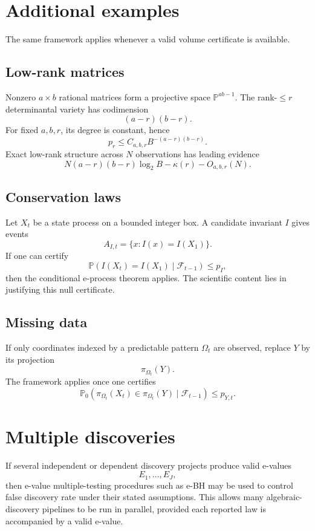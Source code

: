 \documentclass[11pt]{article}
\begin{document}
\section{Additional examples}

The same framework applies whenever a valid volume certificate is available.

\subsection{Low-rank matrices}

Nonzero $a\times b$ rational matrices form a projective space $\mathbb P^{ab-1}$. The rank-$\le r$ determinantal variety has codimension
\[
(a-r)(b-r).
\]
For fixed $a,b,r$, its degree is constant, hence
\[
p_r\le C_{a,b,r}B^{-(a-r)(b-r)}.
\]
Exact low-rank structure across $N$ observations has leading evidence
\[
N(a-r)(b-r)\log_2B-\kappa(r)-O_{a,b,r}(N).
\]

\subsection{Conservation laws}

Let $X_t$ be a state process on a bounded integer box. A candidate invariant $I$ gives events
\[
A_{I,t}=\{x:I(x)=I(X_1)\}.
\]
If one can certify
\[
\mathbb P(I(X_t)=I(X_1)\mid\mathcal F_{t-1})\le p_I,
\]
then the conditional e-process theorem applies. The scientific content lies in justifying this null certificate.

\subsection{Missing data}

If only coordinates indexed by a predictable pattern $\Omega_t$ are observed, replace $Y$ by its projection
\[
\pi_{\Omega_t}(Y).
\]
The framework applies once one certifies
\[
\mathbb P_0(\pi_{\Omega_t}(X_t)\in \pi_{\Omega_t}(Y)\mid\mathcal F_{t-1})\le p_{Y,t}.
\]

\section{Multiple discoveries}

If several independent or dependent discovery projects produce valid e-values
\[
E_1,\dots,E_J,
\]
then e-value multiple-testing procedures such as e-BH may be used to control false discovery rate under their stated assumptions. This allows many algebraic-discovery pipelines to be run in parallel, provided each reported law is accompanied by a valid e-value.
\end{document}

